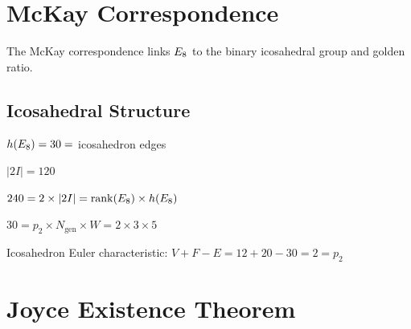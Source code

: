 \chapter{McKay Correspondence}\label{chap:mckay}

The McKay correspondence links $E_8$ to the binary icosahedral group and golden ratio.

\section{Icosahedral Structure}

\begin{definition}\label{def:coxeter}
    \leanok
    $h(E_8) = 30 = $ icosahedron edges
\end{definition}

\begin{definition}\label{def:binary_icosahedral}
    \leanok
    $|2I| = 120$
\end{definition}

\begin{theorem}\label{thm:E8_kissing}
    \leanok
    $240 = 2 \times |2I| = \mathrm{rank}(E_8) \times h(E_8)$
\end{theorem}

\begin{theorem}\label{thm:coxeter_gift}
    \leanok
    $30 = p_2 \times N_{\mathrm{gen}} \times W = 2 \times 3 \times 5$
\end{theorem}

\begin{theorem}[Euler = p2]\label{thm:euler_p2}
    \leanok
    Icosahedron Euler characteristic: $V + F - E = 12 + 20 - 30 = 2 = p_2$
\end{theorem}

\chapter{Joyce Existence Theorem}\label{chap:joyce}

